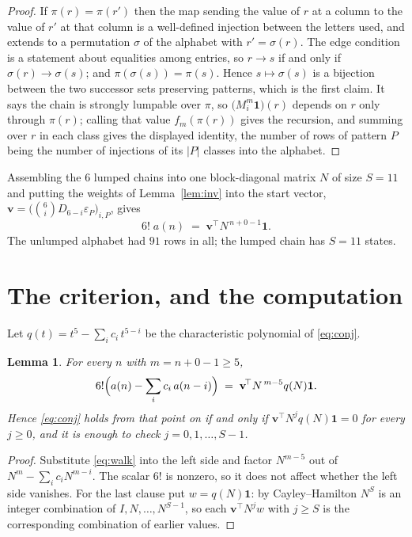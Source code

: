 \documentclass[11pt,a4paper]{article}
\theoremstyle{plain}
\newtheorem{lemma}[theorem]{Lemma}
\theoremstyle{definition}
\begin{document}
\begin{proof}
If $\pi(r)=\pi(r')$ then the map sending the value of $r$ at a column to the value of $r'$
at that column is a well-defined injection between the letters used, and extends to a
permutation $\sigma$ of the alphabet with $r'=\sigma(r)$. The edge condition is a statement
about equalities among entries, so $r\to s$ if and only if $\sigma(r)\to\sigma(s)$; and
$\pi(\sigma(s))=\pi(s)$. Hence $s\mapsto\sigma(s)$ is a bijection between the two successor
sets preserving patterns, which is the first claim. It says the chain is strongly lumpable
over $\pi$, so $\bigl(M_i^{m}\mathbf{1}\bigr)(r)$ depends on $r$ only through $\pi(r)$;
calling that value $f_m(\pi(r))$ gives the recursion, and summing over $r$ in each class
gives the displayed identity, the number of rows of pattern $P$ being the number of
injections of its $|P|$ classes into the alphabet.
\end{proof}

Assembling the $6$ lumped chains into one block-diagonal matrix $N$ of size $S=11$ and
putting the weights of Lemma~\ref{lem:inv} into the start vector,
$\mathbf{v}=\bigl(\binom{6}{i}D_{6-i}\varepsilon_P\bigr)_{i,P}$, gives
\begin{equation}\label{eq:walk}
6!\;a(n)\;=\;\mathbf{v}^{\!\top}N^{\,n+0-1}\mathbf{1} .
\end{equation}
The unlumped alphabet had $91$ rows in all; the lumped chain has $S=11$ states.

\section{The criterion, and the computation}

Let $q(t)=t^{5}-\sum_i c_i\,t^{5-i}$ be the characteristic polynomial of
\eqref{eq:conj}.

\begin{lemma}\label{lem:crit}
For every $n$ with $m=n+0-1\ge5$,
\[
6!\Bigl(a(n)-\sum_i c_i\,a(n-i)\Bigr)\;=\;\mathbf{v}^{\!\top}N^{\,m-5}q(N)\mathbf{1} .
\]
Hence \eqref{eq:conj} holds from that point on if and only if
$\mathbf{v}^{\!\top}N^{j}q(N)\mathbf{1}=0$ for every $j\ge0$, and it is enough to check
$j=0,1,\dots,S-1$.
\end{lemma}

\begin{proof}
Substitute \eqref{eq:walk} into the left side and factor $N^{m-5}$ out of
$N^{m}-\sum_i c_iN^{m-i}$. The scalar $6!$ is nonzero, so it does not affect whether
the left side vanishes. For the last clause put $w=q(N)\mathbf{1}$: by Cayley--Hamilton
$N^{S}$ is an integer combination of $I,N,\dots,N^{S-1}$, so each
$\mathbf{v}^{\!\top}N^{j}w$ with $j\ge S$ is the corresponding combination of earlier
values.
\end{proof}
\end{document}
